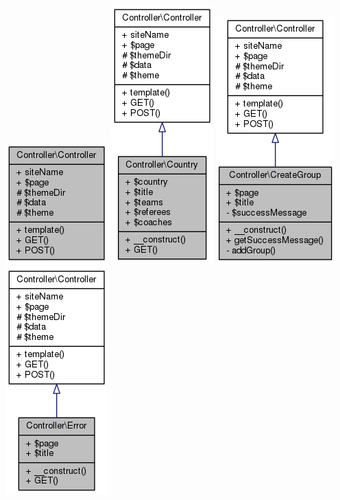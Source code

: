 \documentclass[11pt]{article}
\begin{document}
\includegraphics[scale=0.4]{UML_Controller_1_1Controller.png}
\includegraphics[scale=0.4]{UML_Controller_1_1Country.png}
\includegraphics[scale=0.4]{UML_Controller_1_1CreateGroup.png}
\includegraphics[scale=0.4]{UML_Controller_1_1Error.png}
\end{document}
